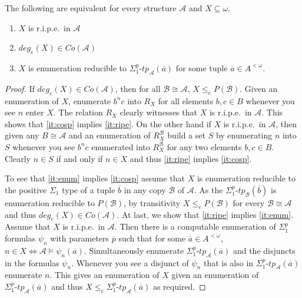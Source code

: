\documentclass[11pt]{amsart}
\providecommand{\tightlist}{%
  \setlength{\itemsep}{0 pt}\setlength{\parskip}{0 pt}}
\newcommand{\A}{{\mathcal{A}}}
\newcommand{\B}{{\mathcal{B}}}
\renewcommand{\bar}[1]{\overline{#1}}
\begin{document}
\begin{thm}\label{thm:ripesets}
    The following are equivalent for every structure $\A$ and $X\subseteq \omega$.
    \begin{enumerate}\tightlist
        \item\label{it:ripe} $X$ is r.i.p.e.\ in $\A$
        \item\label{it:cosp} $deg_e(X)\in Co(\A)$
        \item\label{it:enum} $X$ is enumeration reducible to $\Sigma_1^p\text{-}tp_\A(\bar a)$ for some tuple $\bar a\in A^{<\omega}$.
    \end{enumerate}
\end{thm}
\begin{proof}
    If $deg_e(X)\in Co(\A)$, then for all $\B\cong \A$, $X\leq_e P(\B)$. Given an enumeration of $X$, enumerate $b^nc$ into $R_X$ for all elements $b,c\in B$ whenever you see $n$ enter $X$. The relation $R_X$ clearly witnesses that $X$ is r.i.p.e.\ in $\A$. This shows that \cref{it:cosp} implies \cref{it:ripe}. On the other hand if $X$ is r.i.p.e.\ in $\A$, then given any $B\cong \A$ and an enumeration of $R_X^\B$ build a set $S$ by enumerating $n$ into $S$ whenever you see $b^n c$ enumerated into $R_X^\B$ for any two elements $b,c\in B$. Clearly $n\in S$ if and only if $n\in X$ and thus \cref{it:ripe} implies \cref{it:cosp}.
    
    To see that \cref{it:enum} implies \cref{it:cosp} assume that $X$ is enumeration reducible to the positive $\Sigma_1$ type of a tuple $\bar b$ in any copy $\B$ of $\A$. As the $\Sigma_1^p\text{-}tp_\B(\bar b)$ is enumeration reducible to $P(\B)$, by transitivity $X\leq_e P(\B)$ for every $\B\cong \A$ and thus $deg_e(X)\in Co(\A)$.
    At last, we show that \cref{it:ripe} implies \cref{it:enum}. Assume that $X$ is r.i.p.e.\ in $\A$. Then there is a computable enumeration of $\Sigma^p_1$ formulas $\psi_n$ with parameters $\bar p$ such that for some $\bar a\in A^{<\omega}$, $n\in X \Leftrightarrow \A\models \psi_n(\bar a)$. Simultaneously enumerate $\Sigma^p_1\text{-}tp_\A(\bar a)$ and the disjuncts in the formulas $\psi_n$. Whenever you see a disjunct of $\psi_n$ that is also in $\Sigma^p_1\text{-}tp_\A(\bar a)$ enumerate $n$. This gives an enumeration of $X$ given an enumeration of $\Sigma^p_1\text{-}tp_\A(\bar a)$ and thus $X\leq_e \Sigma^p_1\text{-}tp_\A(\bar a)$ as required.
\end{proof}
\end{document}
